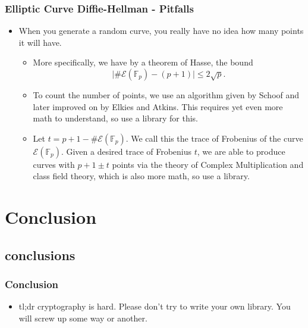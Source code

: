 \documentclass[aspectratio=169,t]{beamer}
\newcommand{\FF}{\mathbb{F}}
\begin{document}
\begin{frame}
\frametitle{Elliptic Curve Diffie-Hellman - Pitfalls}
\begin{itemize}
\item
When you generate a random curve, you really have no idea how many points it
will have. \pause
\begin{itemize}
\item
More specifically, we have by a theorem of Hasse, the bound
\[ \lvert \#\mathcal{E}(\FF_p) - (p + 1) \rvert \leq 2 \sqrt{p}. \]
\item
To count the number of points, we use an algorithm given by Schoof and later
improved on by Elkies and Atkins. This requires yet even more math to
understand, so use a library for this. \pause
\item
Let $t = p + 1 - \#\mathcal{E}(\FF_p)$. We call this the trace of Frobenius of
the curve $\mathcal{E}(\FF_p)$. Given a desired trace of Frobenius $t$, we are
able to produce curves with $p + 1 \pm t$ points via the theory of Complex
Multiplication and class field theory, which is also more math, so use a
library.
\end{itemize}
\end{itemize}
\end{frame}

\section{Conclusion}

\subsection{conclusions}
\begin{frame}
\frametitle{Conclusion}
\begin{itemize}
\item
tl;dr cryptography is hard. Please don't try to write your own library. You will
screw up some way or another.
\end{itemize}
\end{frame}
\end{document}

